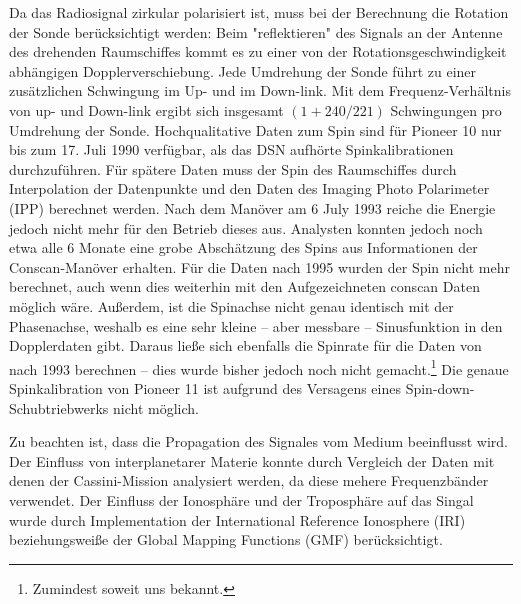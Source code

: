 Da das Radiosignal zirkular polarisiert ist, muss bei der Berechnung die Rotation der Sonde berücksichtigt werden: Beim "reflektieren" des Signals an der Antenne des drehenden Raumschiffes kommt es zu einer von der Rotationsgeschwindigkeit abhängigen Dopplerverschiebung. Jede Umdrehung der Sonde führt zu einer zusätzlichen Schwingung im Up- und im Down-link. Mit dem Frequenz-Verhältnis von up- und Down-link ergibt sich insgesamt $(1+240/221)$ Schwingungen pro Umdrehung der Sonde.\cite{Anderson2002} %
Hochqualitative Daten zum Spin sind für Pioneer 10 nur bis zum 17. Juli 1990 verfügbar, als das DSN aufhörte Spinkalibrationen durchzuführen. Für spätere Daten muss der Spin des Raumschiffes durch Interpolation der Datenpunkte und den Daten des Imaging Photo Polarimeter (IPP) berechnet werden. Nach dem Manöver am 6 July 1993 reiche die Energie jedoch nicht mehr für den Betrieb dieses aus. Analysten konnten jedoch noch etwa alle 6 Monate eine grobe Abschätzung des Spins aus Informationen der Conscan-Manöver erhalten. %
Für die Daten nach 1995 wurden der Spin nicht mehr berechnet, auch wenn dies weiterhin mit den Aufgezeichneten conscan Daten möglich wäre. Außerdem, ist die Spinachse nicht genau identisch mit der Phasenachse, weshalb es eine sehr kleine – aber messbare – Sinusfunktion in den Dopplerdaten gibt. Daraus ließe sich ebenfalls die Spinrate für die Daten von nach 1993 berechnen – dies wurde bisher jedoch noch nicht gemacht.\footnote{Zumindest soweit uns bekannt.}
Die genaue Spinkalibration von Pioneer 11 ist aufgrund des Versagens eines Spin-down-Schubtriebwerks nicht möglich.\cite{Anderson2002}

Zu beachten ist, dass die Propagation des Signales vom Medium beeinflusst wird. Der Einfluss von interplanetarer Materie konnte durch Vergleich
der Daten mit denen der Cassini-Mission analysiert werden, da diese mehere Frequenzbänder verwendet.\cite{Dittus2006} %
Der Einfluss der Ionosphäre und der Troposphäre auf das Singal wurde durch Implementation der International Reference Ionosphere (IRI)
beziehungsweiße der Global Mapping Functions (GMF) berücksichtigt.\cite{Levy2008} %

